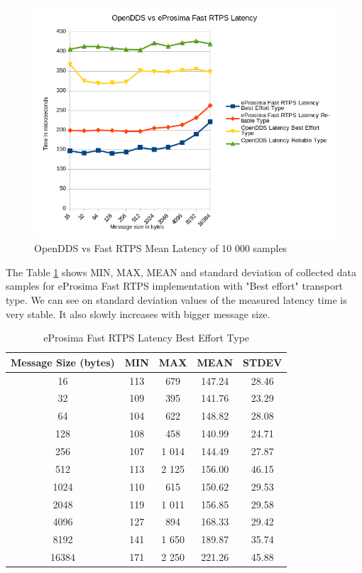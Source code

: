 \documentclass{csfourzero}
\begin{document}
\begin{figure}[!h]
	\centering
	\includegraphics[width=1\textwidth]{graph-results-comparison}
	\caption{\label{fig:graph-results-comparison}OpenDDS vs Fast RTPS Mean Latency of 10 000 samples}
\end{figure}

The Table \ref{eProima-latency-table-best} shows MIN, MAX, MEAN and standard deviation of collected data samples for eProsima Fast RTPS implementation with "Best effort" transport type. We can see on standard deviation values of the measured latency time is very stable. It also slowly increases with bigger message size.

\begin{table}[!ht]
	\centering
	\caption{eProsima Fast RTPS Latency Best Effort Type}
	\label{eProima-latency-table-best}
	\begin{tabular}{|c|c|c|c|c|}
		\hline 
		Message Size (bytes)& MIN & MAX & MEAN & STDEV \\ 
		\hline 
		16 & 113 & 679 & 147.24 & 28.46 \\ 
		\hline 
		32 & 109 & 395 & 141.76 & 23.29 \\ 
		\hline 
		64 & 104 & 622 & 148.82 & 28.08 \\ 
		\hline 
		128 & 108 & 458 & 140.99 & 24.71 \\ 
		\hline 
		256 & 107 & 1 014 & 144.49 & 27.87 \\ 
		\hline 
		512 & 113 & 2 125 & 156.00 & 46.15 \\ 
		\hline 
		1024 & 110 & 615 & 150.62 & 29.53 \\ 
		\hline 
		2048 & 119 & 1 011 & 156.85 & 29.58 \\ 
		\hline 
		4096 & 127 & 894 & 168.33 & 29.42 \\ 
		\hline 
		8192 & 141 & 1 650 & 189.87 & 35.74 \\ 
		\hline 
		16384 & 171 & 2 250 & 221.26 & 45.88 \\ 
		\hline 
	\end{tabular}
\end{table}
\end{document}
